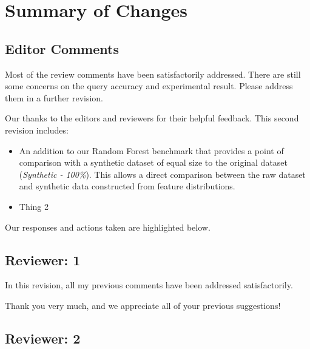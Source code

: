 \documentclass{article}
\begin{document}
\section*{Summary of Changes}\label{summary-of-changes}
\subsection*{Editor Comments}\label{editor-comments}

Most of the review comments have been satisfactorily addressed. There are still some concerns on the query accuracy and experimental result. Please address them in a further revision.

\begin{tcolorbox}
    Our thanks to the editors and reviewers for their helpful feedback. This second revision includes:

\begin{itemize}
    \item An addition to our Random Forest benchmark that provides a point of comparison with a synthetic dataset of equal size to the original dataset (\emph{Synthetic - 100\%}). This allows a direct comparison between the raw dataset and synthetic data constructed from feature distributions.

\item Thing 2
\end{itemize}
%
Our responses and actions taken are highlighted below.
\end{tcolorbox}

\vspace{1em}

\subsection*{Reviewer: 1}\label{reviewer-1}

In this revision, all my previous comments have been addressed satisfactorily.

\begin{tcolorbox}
    Thank you very much, and we appreciate all of your previous suggestions!
\end{tcolorbox}

\vspace{1em}

\subsection*{Reviewer: 2}\label{reviewer-2}
\end{document}
